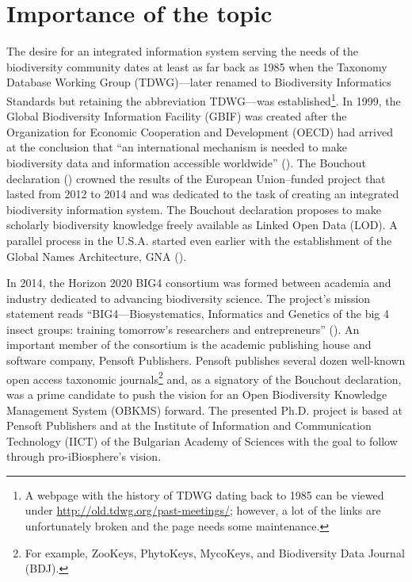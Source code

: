\label{chapter-introduction} 
\newcommand{\keyword}[1]{\textbf{#1}}
\newcommand{\tabhead}[1]{\textbf{#1}}
\newcommand{\code}[1]{\texttt{#1}}
\newcommand{\file}[1]{\texttt{\bfseries#1}}
\newcommand{\option}[1]{\texttt{\itshape#1}}
\section*{Importance of the topic}
The desire for an integrated information system serving the needs of the biodiversity community dates at least as far back as 1985 when the Taxonomy Database Working Group (TDWG)---later renamed to Biodiversity Informatics Standards but retaining the abbreviation TDWG---was established\footnote{A webpage with the history of TDWG dating back to 1985 can be viewed under \url{http://old.tdwg.org/past-meetings/}; however, a lot of the links are unfortunately broken and the page needs some maintenance.}. In 1999, the Global Biodiversity Information Facility (GBIF) was created after the Organization for Economic Cooperation and Development (OECD) had arrived at the conclusion that ``an international mechanism is needed to make biodiversity data and information accessible worldwide'' (\cite{noauthor_what_nodate}).  The Bouchout declaration (\cite{noauthor_bouchout_2014}) crowned the results of the European Union--funded project \cite{noauthor_pro-ibiosphere_nodate} that lasted from 2012 to 2014 and was dedicated to the task of creating an integrated biodiversity information system. The Bouchout declaration proposes to make scholarly biodiversity knowledge freely available as Linked Open Data (LOD).  A parallel process in the U.S.A. started even earlier with the establishment of the Global Names Architecture, GNA (\cite{patterson_names_2010,pyle_towards_2016}).

In 2014, the Horizon 2020 BIG4 consortium was formed between academia and industry dedicated to advancing biodiversity science.  The project's mission statement reads ``BIG4---Biosystematics, Informatics and Genetics of the big 4 insect groups: training tomorrow's researchers and entrepreneurs'' (\cite{university_of_copenhagen_big4_2014}). An important member of the consortium is the academic publishing house and software company, Pensoft Publishers. Pensoft publishes several dozen well-known open access taxonomic journals\footnote{For example, ZooKeys, PhytoKeys, MycoKeys, and Biodiversity Data Journal (BDJ).} and, as a signatory of the Bouchout declaration, was a prime candidate to push the vision for an Open Biodiversity Knowledge Management System (OBKMS) forward. The presented Ph.D. project is based at Pensoft Publishers and at the Institute of Information and Communication Technology (IICT) of the Bulgarian Academy of Sciences with the goal to follow through pro-iBiosphere's vision.

